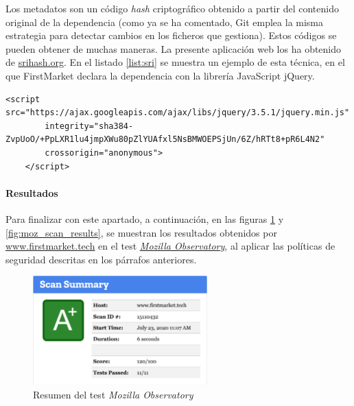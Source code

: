 \documentclass[a4paper]{article}
\begin{document}
	Los metadatos son un código \emph{hash} criptográfico obtenido a partir del contenido original de la dependencia (como ya se ha comentado, Git emplea la misma estrategia para detectar cambios en los ficheros que gestiona). Estos códigos se pueden obtener de muchas maneras. La presente aplicación web los ha obtenido de \href{https://www.srihash.org/}{srihash.org}. En el listado \ref{list:sri} se muestra un ejemplo de esta técnica, en el que FirstMarket declara la dependencia con la librería JavaScript jQuery.
	\\
	
	\begin{lstlisting}[caption=Subresource Integrity, label=list:sri]
	<script src="https://ajax.googleapis.com/ajax/libs/jquery/3.5.1/jquery.min.js"
		integrity="sha384-ZvpUoO/+PpLXR1lu4jmpXWu80pZlYUAfxl5NsBMWOEPSjUn/6Z/hRTt8+pR6L4N2"
		crossorigin="anonymous">
	</script>
	\end{lstlisting}
	
	\paragraph{Resultados}
	Para finalizar con este apartado, a continuación, en las figuras \ref{fig:moz_scan_summary} y \ref{fig:moz_scan_results}, se muestran los resultados obtenidos por \href{https://firstmarket.tech}{www.firstmarket.tech} en el test \href{https://observatory.mozilla.org/analyze/www.firstmarket.tech}{\emph{Mozilla Observatory}}, al aplicar las políticas de seguridad descritas en los párrafos anteriores.
	
	\begin{figure}[hbt!]
		\centering
		\includegraphics[width=0.6\textwidth,keepaspectratio]{moz_scan_summary}
		\caption{Resumen del test \emph{Mozilla Observatory}}
		\label{fig:moz_scan_summary}
	\end{figure}
\end{document}

